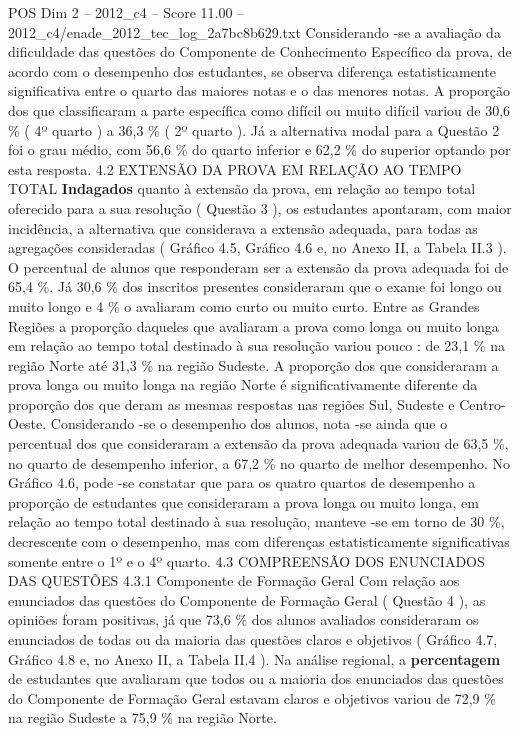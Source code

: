 \begin{textsample}{POS Dim 2 – 2012\_c4 – Score 11.00 – 2012\_c4/enade\_2012\_tec\_log\_2a7bc8b629.txt}
Considerando -se a avaliação da dificuldade das questões do Componente de Conhecimento Específico da prova, de acordo com o desempenho dos estudantes, se observa diferença estatisticamente significativa entre o quarto das maiores notas e o das menores notas.
A proporção dos que classificaram a parte específica como difícil ou muito difícil variou de 30,6 \% ( 4º quarto ) a 36,3 \% ( 2º quarto ).
Já a alternativa modal para a Questão 2 foi o grau médio, com 56,6 \% do quarto inferior e 62,2 \% do superior optando por esta resposta. 4.2 EXTENSÃO DA PROVA EM RELAÇÃO AO TEMPO TOTAL \textbf{Indagados} quanto à extensão da prova, em relação ao tempo total oferecido para a sua resolução ( Questão 3 ), os estudantes apontaram, com maior incidência, a alternativa que considerava a extensão adequada, para todas as agregações consideradas ( Gráfico 4.5, Gráfico 4.6 e, no Anexo II, a Tabela II.3 ).
O percentual de alunos que responderam ser a extensão da prova adequada foi de 65,4 \%.
Já 30,6 \% dos inscritos presentes consideraram que o exame foi longo ou muito longo e 4 \% o avaliaram como curto ou muito curto.
Entre as Grandes Regiões a proporção daqueles que avaliaram a prova como longa ou muito longa em relação ao tempo total destinado à sua resolução variou pouco : de 23,1 \% na região Norte até 31,3 \% na região Sudeste.
A proporção dos que consideraram a prova longa ou muito longa na região Norte é significativamente diferente da proporção dos que deram as mesmas respostas nas regiões Sul, Sudeste e Centro-Oeste.
Considerando -se o desempenho dos alunos, nota -se ainda que o percentual dos que consideraram a extensão da prova adequada variou de 63,5 \%, no quarto de desempenho inferior, a 67,2 \% no quarto de melhor desempenho.
No Gráfico 4.6, pode -se constatar que para os quatro quartos de desempenho a proporção de estudantes que consideraram a prova longa ou muito longa, em relação ao tempo total destinado à sua resolução, manteve -se em torno de 30 \%, decrescente com o desempenho, mas com diferenças estatisticamente significativas somente entre o 1º e o 4º quarto. 4.3 COMPREENSÃO DOS ENUNCIADOS DAS QUESTÕES 4.3.1 Componente de Formação Geral Com relação aos enunciados das questões do Componente de Formação Geral ( Questão 4 ), as opiniões foram positivas, já que 73,6 \% dos alunos avaliados consideraram os enunciados de todas ou da maioria das questões claros e objetivos ( Gráfico 4.7, Gráfico 4.8 e, no Anexo II, a Tabela II.4 ).
Na análise regional, a \textbf{percentagem} de estudantes que avaliaram que todos ou a maioria dos enunciados das questões do Componente de Formação Geral estavam claros e objetivos variou de 72,9 \% na região Sudeste a 75,9 \% na região Norte.

\end{textsample}
